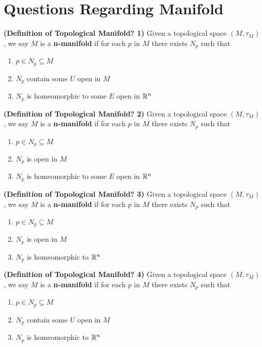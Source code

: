 \documentclass{report}
\begin{document}
\section{Questions Regarding Manifold}
\begin{definition}
\textbf{(Definition of Topological Manifold? 1)} Given a topological space $(M,\tau_M)$, we say $M$ is a \textbf{n-manifold} if for each $p$ in $M$ there exists $N_p$ such that
\begin{enumerate}[label=(\alph*)]
  \item $p\in N_p \subseteq M$
  \item $N_p$ contain  some  $U$ open in $M$ 
  \item $N_p$ is homeomorphic to some $E$ open in $\mathbb{R}^n$
\end{enumerate}
\end{definition}
\begin{definition}
\textbf{(Definition of Topological Manifold? 2)} Given a topological space $(M,\tau_M)$, we say $M$ is a \textbf{n-manifold} if for each $p$ in $M$ there exists $N_p$ such that
\begin{enumerate}[label=(\alph*)]
  \item $p\in N_p \subseteq M$
  \item $N_p$ is open in $M$ 
  \item $N_p$ is homeomorphic to some $E$ open in $\mathbb{R}^n$
\end{enumerate}
\end{definition}
\begin{definition}
\textbf{(Definition of Topological Manifold? 3)} Given a topological space $(M,\tau_M)$, we say $M$ is a \textbf{n-manifold} if for each $p$ in $M$ there exists $N_p$ such that
\begin{enumerate}[label=(\alph*)]
  \item $p\in N_p \subseteq M$
  \item $N_p$ is open in $M$ 
  \item $N_p$ is homeomorphic to $\mathbb{R}^n$
\end{enumerate}
\end{definition}
\begin{definition}
\textbf{(Definition of Topological Manifold? 4)} Given a topological space $(M,\tau_M)$, we say $M$ is a \textbf{n-manifold} if for each $p$ in $M$ there exists $N_p$ such that
\begin{enumerate}[label=(\alph*)]
  \item $p\in N_p \subseteq M$
  \item $N_p$ contain some $U$ open in $M$ 
  \item $N_p$ is homeomorphic to $\mathbb{R}^n$
\end{enumerate}
\end{definition}
\end{document}
